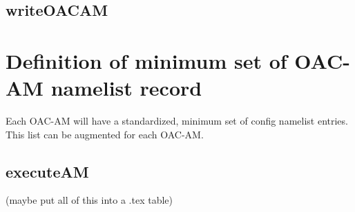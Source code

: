 \documentclass[11pt]{report}
\begin{document}
\subsection{writeOACAM}


\section{Definition of minimum set of OAC-AM namelist record}
Each OAC-AM will have a standardized, minimum set of config namelist entries. This list can be augmented for each OAC-AM.

\subsection{executeAM}

(maybe put all of this into a .tex table)





\end{document}
